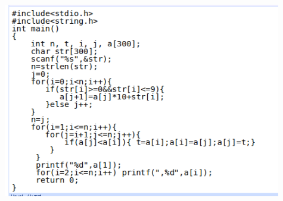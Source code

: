 \documentclass[color=usenames,dvipsnames]{beamer}
\begin{document}
{{\begin{columns}
\begin{enumerate}
     \end{enumerate}

     
     \column{0.6\hsize}
     \includegraphics[width=0.9\hsize]{pic/提取数字串按数值排序-bad.png}
     \end{columns}
     }
}
\end{document}
